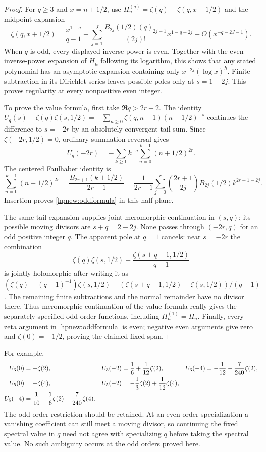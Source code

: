\begin{proof}
For $q\ge3$ and $x=n+1/2$, use
$H_n^{(q)}=\zeta(q)-\zeta(q,x+1/2)$ and the midpoint expansion
\[
 \zeta(q,x+1/2)=\frac{x^{1-q}}{q-1}
 +\sum_{j=1}^{J}\frac{B_{2j}(1/2)(q)_{2j-1}}{(2j)!}
                                       x^{1-q-2j}
 +O(x^{-q-2J-1}).
\]
When $q$ is odd, every displayed inverse power is even. Together
with the even inverse-power expansion of $H_n$ following its
logarithm, this shows that any stated polynomial has an asymptotic
expansion containing only $x^{-2j}(\log x)^h$. Finite subtraction
in its Dirichlet series leaves possible poles only at $s=1-2j$.
This proves regularity at every nonpositive even integer.

To prove the value formula, first take $\Re q>2r+2$. The identity
$U_q(s)-\zeta(q)\zeta(s,1/2)
=-\sum_{n\ge0}\zeta(q,n+1)(n+1/2)^{-s}$ continues the difference
to $s=-2r$ by an absolutely convergent tail sum. Since
$\zeta(-2r,1/2)=0$, ordinary summation reversal gives
\[
 U_q(-2r)=-\sum_{k\ge1}k^{-q}
                         \sum_{n=0}^{k-1}(n+1/2)^{2r}.
\]
The centered Faulhaber identity is
\[
 \sum_{n=0}^{k-1}(n+1/2)^{2r}
 =\frac{B_{2r+1}(k+1/2)}{2r+1}
 =\frac1{2r+1}\sum_{j=0}^{r}\binom{2r+1}{2j}
                              B_{2j}(1/2)k^{2r+1-2j}.
\]
Insertion proves \eqref{hpnew:oddformula} in this half-plane.

The same tail expansion supplies joint meromorphic continuation
in $(s,q)$; its possible moving divisors are $s+q=2-2j$.
None passes through $(-2r,q)$ for an odd positive integer $q$.
The apparent pole at $q=1$ cancels: near $s=-2r$ the combination
\[
 \zeta(q)\zeta(s,1/2)-\frac{\zeta(s+q-1,1/2)}{q-1}
\]
is jointly holomorphic after writing it as
$(\zeta(q)-(q-1)^{-1})\zeta(s,1/2)
-(\zeta(s+q-1,1/2)-\zeta(s,1/2))/(q-1)$.
The remaining finite subtractions and the normal remainder have
no divisor there. Thus meromorphic continuation of the value formula
really gives the separately specified odd-order functions, including
$H_n^{(1)}=H_n$. Finally, every zeta argument in
\eqref{hpnew:oddformula} is even; negative even arguments give zero
and $\zeta(0)=-1/2$, proving the claimed fixed span.
\end{proof}

For example,
\begin{align}\label{hpnew:thirdorder}
 U_3(0)&=-\zeta(2),&
 U_3(-2)&=\frac16+\frac1{12}\zeta(2),&
 U_3(-4)&=-\frac1{12}-\frac7{240}\zeta(2),\\
 U_5(0)&=-\zeta(4),&
 U_5(-2)&=-\frac13\zeta(2)+\frac1{12}\zeta(4),\notag\\
 U_5(-4)&=\frac1{10}+\frac16\zeta(2)-\frac7{240}\zeta(4).
                                                               \notag
\end{align}
The odd-order restriction should be retained. At an even-order
specialization a vanishing coefficient can still meet a moving divisor,
so continuing the fixed spectral value in $q$ need not agree with
specializing $q$ before taking the spectral value. No such ambiguity
occurs at the odd orders proved here.


